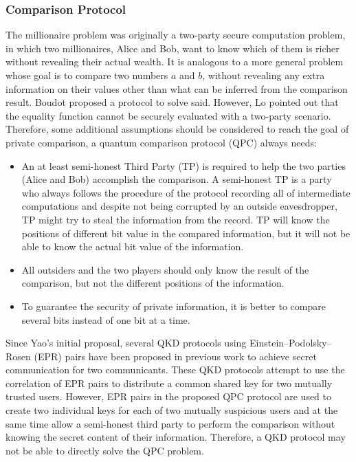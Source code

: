 \begin{refsection}
	\subsubsection{Comparison Protocol}
The millionaire problem was originally a two-party secure computation problem, in which two millionaires, Alice and Bob, want to know which of them is richer without revealing their actual wealth.  It is analogous	to a more general problem whose goal is to compare two numbers $a$ and $b$, without revealing any extra information	on their values other than what can be inferred from	the comparison result. Boudot proposed a protocol to solve said. However, Lo pointed out that the equality function cannot be securely evaluated with a two-party scenario. Therefore, some additional assumptions should be considered to reach the goal of private comparison, a quantum comparison protocol (QPC) always needs:
\begin{itemize}
	\item An at least semi-honest Third Party (TP) is required to help the two parties (Alice and Bob) accomplish the comparison. A semi-honest TP is a party who
	always follows the procedure of the protocol recording all of intermediate computations and despite not being corrupted by an outside eavesdropper, TP might try to steal the information from the record. TP will know the positions of different bit value in the compared information, but it will not be able to know the actual bit value of the information.
	\item All outsiders and the two players should only know the result of the comparison, but not the different positions of the information.
	\item To guarantee the security of private information, it is better to compare several
	bits instead of one bit at a time.
\end{itemize}
Since Yao's initial proposal, several QKD protocols using Einstein–Podolsky–
Rosen (EPR) pairs have been proposed in previous work to achieve secret communication for two communicants. These QKD protocols attempt to use the correlation of EPR pairs to distribute a common shared key for two mutually trusted users. However, EPR pairs in the proposed QPC protocol are used to create two individual keys for each of two mutually suspicious users and at the same time allow a semi-honest third party to perform the comparison without knowing the secret content of their information. Therefore, a QKD protocol may not be able to directly solve the QPC problem.

\clearpage
\printbibliography[heading=subbibliography]
\end{refsection}
\cleardoublepage
